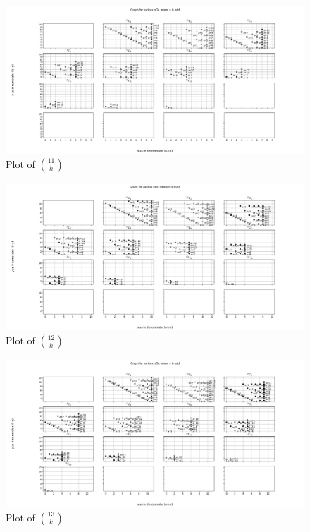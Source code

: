 \documentclass[10pt, twoside]{article}
\newcommand*{\Combination}[2]{\binom{#1}{#2}}%
\begin{document}
\begin{appendices}
\begin{figure}[ph!]	
	\includegraphics[width=\linewidth]{11Ck.png}
	\caption{Plot of $\Combination{11}{k}$}
	\label{11Ck}									
\end{figure}
\begin{figure}[ph!]	
	\includegraphics[width=\linewidth]{12Ck.png}
	\caption{Plot of $\Combination{12}{k}$}
	\label{12Ck}
\end{figure}	
\begin{figure}[ph!]	
	\includegraphics[width=\linewidth]{13Ck.png}
	\caption{Plot of $\Combination{13}{k}$}
	\label{13Ck}									
\end{figure}
\begin{figure}[ph!]

\end{figure}
\end{appendices}
\end{document}
